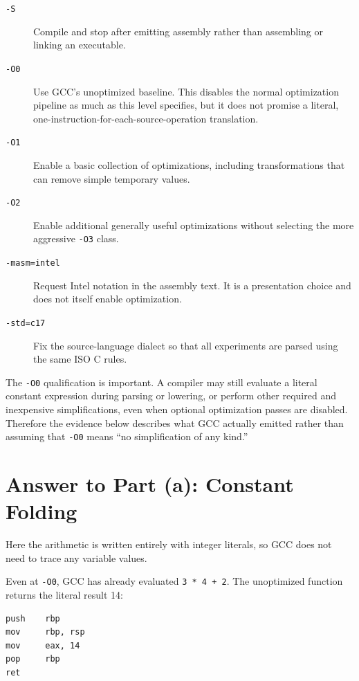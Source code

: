 \documentclass[11pt]{article}
\newcommand{\code}[1]{\texttt{#1}}
\begin{document}
\begin{description}
  \item[\code{-S}] Compile and stop after emitting assembly rather than
    assembling or linking an executable.
  \item[\code{-O0}] Use GCC's unoptimized baseline. This disables the normal
    optimization pipeline as much as this level specifies, but it does not
    promise a literal, one-instruction-for-each-source-operation translation.
  \item[\code{-O1}] Enable a basic collection of optimizations, including
    transformations that can remove simple temporary values.
  \item[\code{-O2}] Enable additional generally useful optimizations without
    selecting the more aggressive \code{-O3} class.
  \item[\code{-masm=intel}] Request Intel notation in the assembly text. It is
    a presentation choice and does not itself enable optimization.
  \item[\code{-std=c17}] Fix the source-language dialect so that all experiments
    are parsed using the same ISO C rules.
\end{description}

The \code{-O0} qualification is important. A compiler may still evaluate a
literal constant expression during parsing or lowering, or perform other
required and inexpensive simplifications, even when optional optimization
passes are disabled. Therefore the evidence below describes what GCC actually
emitted rather than assuming that \code{-O0} means ``no simplification of any
kind.''

\clearpage
\section{Answer to Part (a): Constant Folding}

Here the arithmetic is written entirely with integer literals, so GCC does not
need to trace any variable values.



Even at \code{-O0}, GCC has already evaluated \code{3 * 4 + 2}. The
unoptimized function returns the literal result 14:

\begin{lstlisting}[numbers=none,caption={Relevant \code{-O0} assembly for folding.}]
push    rbp
mov     rbp, rsp
mov     eax, 14
pop     rbp
ret
\end{lstlisting}
\end{document}

